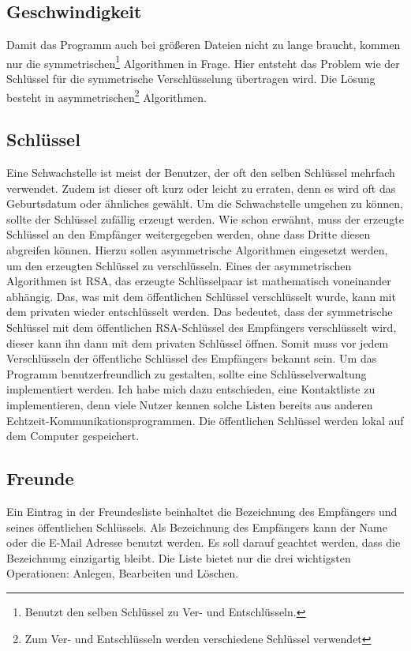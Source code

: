 \documentclass[12pt,a4paper,titlepage]{article}
\begin{document}
\subsection{Geschwindigkeit}
Damit das Programm auch bei größeren Dateien nicht zu lange braucht, kommen nur die symmetrischen\footnote{Benutzt den selben Schlüssel zu Ver- und Entschlüsseln.} Algorithmen in Frage. Hier entsteht das Problem wie der Schlüssel für die symmetrische Verschlüsselung übertragen wird. Die Lösung besteht in asymmetrischen\footnote{Zum Ver- und Entschlüsseln werden verschiedene Schlüssel verwendet} Algorithmen. 
\subsection{Schlüssel}
Eine Schwachstelle ist meist der Benutzer, der oft den selben Schlüssel mehrfach verwendet. Zudem ist dieser oft kurz oder leicht zu erraten, denn es wird oft das Geburtsdatum oder ähnliches gewählt. Um die Schwachstelle umgehen zu können, sollte der Schlüssel zufällig erzeugt werden. Wie schon erwähnt, muss der erzeugte Schlüssel an den Empfänger weitergegeben werden, ohne dass Dritte diesen abgreifen können. Hierzu sollen asymmetrische Algorithmen eingesetzt werden, um den erzeugten Schlüssel zu verschlüsseln. Eines der asymmetrischen Algorithmen ist RSA, das erzeugte Schlüsselpaar ist mathematisch voneinander abhängig. Das, was mit dem öffentlichen Schlüssel verschlüsselt wurde, kann mit dem privaten wieder entschlüsselt werden. Das bedeutet, dass der symmetrische Schlüssel mit dem öffentlichen RSA-Schlüssel des Empfängers verschlüsselt wird, dieser kann ihn dann mit dem privaten Schlüssel öffnen. Somit muss vor jedem Verschlüsseln der öffentliche Schlüssel des Empfängers bekannt sein. Um das Programm benutzerfreundlich zu gestalten, sollte eine Schlüsselverwaltung implementiert werden. Ich habe mich dazu entschieden, eine Kontaktliste zu implementieren, denn viele Nutzer kennen solche Listen bereits aus anderen Echtzeit-Kommunikationsprogrammen. Die öffentlichen Schlüssel werden lokal auf dem Computer gespeichert.
\subsection{Freunde}
Ein Eintrag in der Freundesliste beinhaltet die Bezeichnung des Empfängers und seines öffentlichen Schlüssels. Als Bezeichnung des Empfängers kann der Name oder die E-Mail Adresse benutzt werden. Es soll darauf geachtet werden, dass die Bezeichnung einzigartig bleibt. Die Liste bietet nur die drei wichtigsten Operationen: Anlegen, Bearbeiten und Löschen.
\newpage
\end{document}
